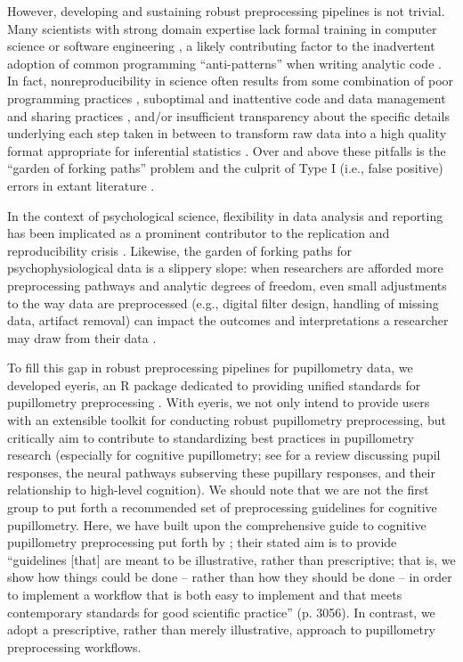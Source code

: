 However, developing and sustaining robust preprocessing pipelines is not trivial. Many scientists with strong domain expertise lack formal training in computer science or software engineering \parencite{chen2025exploring,segal2008scientists}, a likely contributing factor to the inadvertent adoption of common programming ``anti-patterns'' when writing analytic code \parencite{wilson2014best}. In fact, nonreproducibility in science often results from some combination of poor programming practices \parencite{hatton1997texperiments,hatton1994accurate,merali2010error,miller2006scientists}, suboptimal and inattentive code and data management and sharing practices \parencite{frank2025replication,gorgolewski2016practical,kovacs2024opening}, and/or insufficient transparency about the specific details underlying each step taken in between to transform raw data into a high quality format appropriate for inferential statistics \parencite{poldrack2019computational}. Over and above these pitfalls is the ``garden of forking paths'' problem and the culprit of Type I (i.e., false positive) errors in extant literature \parencite{gelman2013garden,poldrack2017scanning,simmons2011false}.

In the context of psychological science, flexibility in data analysis and reporting has been implicated as a prominent contributor to the replication and reproducibility crisis \parencite{hardwicke2021analytic,hardwicke2018data,hardwicke2022estimating,ioannidis2005why,osc2015estimating}. Likewise, the garden of forking paths for psychophysiological data is a slippery slope: when researchers are afforded more preprocessing pathways and analytic degrees of freedom, even small adjustments to the way data are preprocessed (e.g., digital filter design, handling of missing data, artifact removal) can impact the outcomes and interpretations a researcher may draw from their data \parencite{soskic2024garden}.

To fill this gap in robust preprocessing pipelines for pupillometry data, we developed eyeris, an R package dedicated to providing unified standards for pupillometry preprocessing \parencite{schwartz2025eyeris}. With eyeris, we not only intend to provide users with an extensible toolkit for conducting robust pupillometry preprocessing, but critically aim to contribute to standardizing best practices in pupillometry research (especially for cognitive pupillometry; see \textcite{mathot2018pupillometry} for a review discussing pupil responses, the neural pathways subserving these pupillary responses, and their relationship to high-level cognition). We should note that we are not the first group to put forth a recommended set of preprocessing guidelines for cognitive pupillometry. Here, we have built upon the comprehensive guide to cognitive pupillometry preprocessing put forth by \textcite{mathot2023methods}; their stated aim is to provide ``guidelines [that] are meant to be illustrative, rather than prescriptive; that is, we show how things could be done – rather than how they should be done – in order to implement a workflow that is both easy to implement and that meets contemporary standards for good scientific practice'' (p. 3056). In contrast, we adopt a prescriptive, rather than merely illustrative, approach to pupillometry preprocessing workflows.

